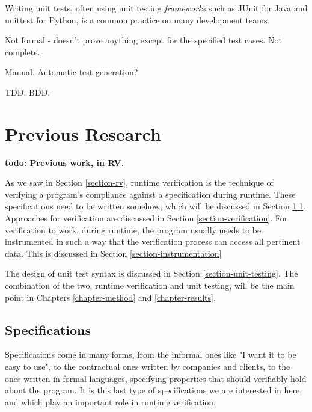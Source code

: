 \documentclass[a4paper,11pt]{kth-mag}
\newcommand{\todo}[1]{\textbf{todo: #1}}
\begin{document}
Writing unit tests, often using unit testing \textit{frameworks} such as JUnit
\cite{junit} for Java and unittest \cite{python-unittest} for Python, is a
common practice on many development teams.

Not formal - doesn't prove anything except for the specified test cases. Not
complete.

Manual. Automatic test-generation?

TDD. BDD.





\pagestyle{newchap}
\chapter{Previous Research} \label{chapter-previous-research}

\todo{Previous work, in RV.}

As we saw in Section \ref{section-rv}, runtime verification is the technique of
verifying a program's compliance against a specification during runtime. These
specifications need to be written somehow, which will be discussed in Section
\ref{section-specifications}. Approaches for verification are discussed in
Section \ref{section-verification}. For verification to work, during runtime,
the program usually needs to be instrumented in such a way that the
verification process can access all pertinent data. This is discussed in
Section \ref{section-instrumentation}

The design of unit test syntax is discussed in Section
\ref{section-unit-testing}. The combination of the two, runtime verification
and unit testing, will be the main point in Chapters \ref{chapter-method} and
\ref{chapter-results}.


\section{Specifications} \label{section-specifications}

Specifications come in many forms, from the informal ones like "I want it to be
easy to use", to the contractual ones written by companies and clients, to the
ones written in formal languages, specifying properties that should verifiably
hold about the program. It is this last type of specifications we are
interested in here, and which play an important role in runtime verification.
\end{document}
